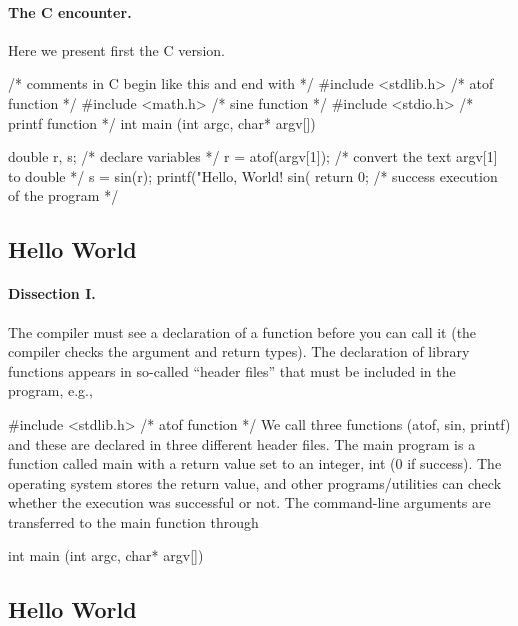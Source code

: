 \documentclass[%
twoside,                 %
final,                   %
10pt]{article}
\newenvironment{paragraphadmon}[1][]{\paragraph{#1}}{}
\begin{document}
\begin{paragraphadmon}[The C encounter.]
Here we present first the C version.

\bcppcod
/* comments in C begin like this and end with */
#include <stdlib.h> /* atof function */
#include <math.h>   /* sine function */
#include <stdio.h>  /* printf function */
int main (int argc, char* argv[])
{
  double r, s;        /* declare variables */
  r = atof(argv[1]);  /* convert the text argv[1] to double */
  s = sin(r);
  printf("Hello, World! sin(%
  return 0;           /* success execution of the program */

\ecppcod
\end{paragraphadmon}



\subsection{Hello World}


\begin{paragraphadmon}[Dissection I.]
The compiler must see a declaration of a function before you can
call it (the compiler checks the argument and return types).
The declaration of library functions appears
in so-called ``header files'' that must be included in the program, e.g.,

\bcppcod
   #include <stdlib.h> /* atof function */
\ecppcod
We call three functions (atof, sin, printf)
and these are declared in three different header files.
The main program is a function called main
with a return value set to an integer, int (0 if success).
The operating system stores the return value,
and other programs/utilities can check whether
the execution was successful or not.
The command-line arguments are transferred to the main function through

\bcppcod
   int main (int argc, char* argv[])
\ecppcod
\end{paragraphadmon}



\subsection{Hello World}
\end{document}
